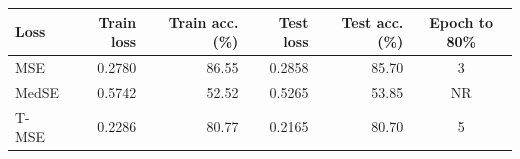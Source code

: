 \begin{tabular}{lrrrrc}
\toprule
Loss & Train loss & Train acc. (\%) & Test loss & Test acc. (\%) & Epoch to 80\% \\
\midrule
MSE & 0.2780 & 86.55 & 0.2858 & 85.70 & 3 \\
MedSE & 0.5742 & 52.52 & 0.5265 & 53.85 & NR \\
T-MSE & 0.2286 & 80.77 & 0.2165 & 80.70 & 5 \\
\bottomrule
\end{tabular}